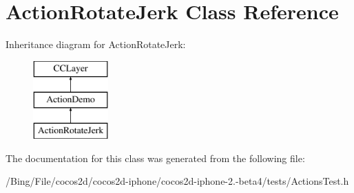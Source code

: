 \hypertarget{interface_action_rotate_jerk}{\section{Action\-Rotate\-Jerk Class Reference}
\label{interface_action_rotate_jerk}
}
Inheritance diagram for Action\-Rotate\-Jerk\-:\begin{figure}[H]
\begin{center}
\leavevmode
\includegraphics[height=3.000000cm]{interface_action_rotate_jerk}
\end{center}
\end{figure}


The documentation for this class was generated from the following file\-:\begin{DoxyCompactItemize}
\item 
/\-Bing/\-File/cocos2d/cocos2d-\/iphone/cocos2d-\/iphone-\/2.-\/beta4/tests/Actions\-Test.\-h\end{DoxyCompactItemize}
